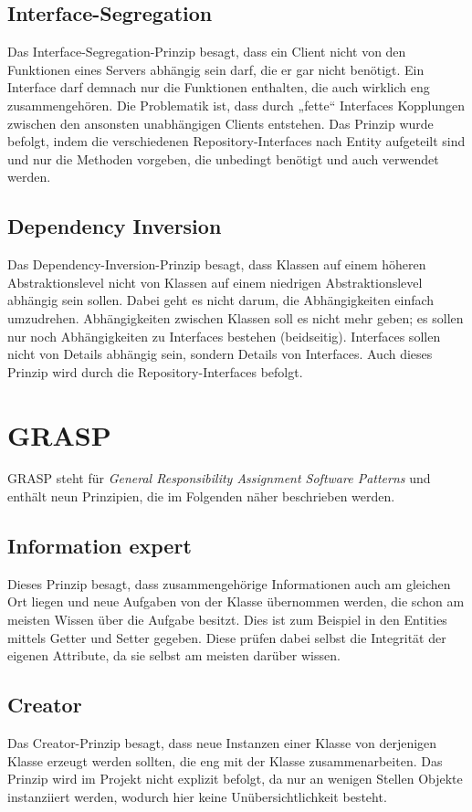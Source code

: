 \subsection{Interface-Segregation}
Das Interface-Segregation-Prinzip besagt, dass ein Client nicht von den Funktionen eines Servers abhängig sein darf, die er gar nicht benötigt. Ein Interface darf demnach nur die Funktionen enthalten, die auch wirklich eng zusammengehören. Die Problematik ist, dass durch „fette“ Interfaces Kopplungen zwischen den ansonsten unabhängigen Clients entstehen. Das Prinzip wurde befolgt, indem die verschiedenen Repository-Interfaces nach Entity aufgeteilt sind und nur die Methoden vorgeben, die unbedingt benötigt und auch verwendet werden.
\subsection{Dependency Inversion}
Das Dependency-Inversion-Prinzip besagt, dass Klassen auf einem höheren Abstraktionslevel nicht von Klassen auf einem niedrigen Abstraktionslevel abhängig sein sollen. Dabei geht es nicht darum, die Abhängigkeiten einfach umzudrehen. Abhängigkeiten zwischen Klassen soll es nicht mehr geben; es sollen nur noch Abhängigkeiten zu Interfaces bestehen (beidseitig). Interfaces sollen nicht von Details abhängig sein, sondern Details von Interfaces. Auch dieses Prinzip wird durch die Repository-Interfaces befolgt.

\section{GRASP}
GRASP steht für \textit{General Responsibility Assignment Software Patterns} und enthält neun Prinzipien, die im Folgenden näher beschrieben werden.

    \subsection{Information expert}
    Dieses Prinzip besagt, dass zusammengehörige Informationen auch am gleichen Ort liegen und neue Aufgaben von der Klasse übernommen werden, die schon am meisten Wissen über die Aufgabe besitzt. Dies ist zum Beispiel in den Entities mittels Getter und Setter gegeben. Diese prüfen dabei selbst die Integrität der eigenen Attribute, da sie selbst am meisten darüber wissen.
    
    \subsection{Creator}
    Das Creator-Prinzip besagt, dass neue Instanzen einer Klasse von derjenigen Klasse erzeugt werden sollten, die eng mit der Klasse zusammenarbeiten. Das Prinzip wird im Projekt nicht explizit befolgt, da nur an wenigen Stellen Objekte instanziiert werden, wodurch hier keine Unübersichtlichkeit besteht.

